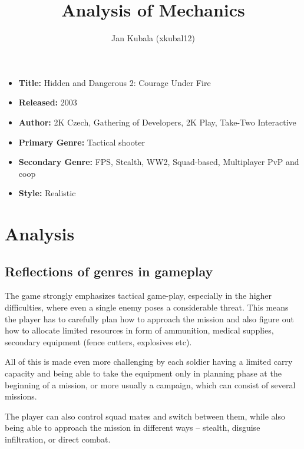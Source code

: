 \documentclass[a4paper,10pt,english]{article}
\title{%
Analysis of Mechanics%
}
\author{%
Jan Kubala (xkubal12)%
}
\date{}
\begin{document}
\maketitle
\thispagestyle{empty}

{%
\large

\begin{itemize}

\item[] \textbf{Title:} Hidden and Dangerous 2: Courage Under Fire

\item[] \textbf{Released:} 2003

\item[] \textbf{Author:} 2K Czech, Gathering of Developers, 2K Play, Take-Two Interactive

\item[] \textbf{Primary Genre:} Tactical shooter

\item[] \textbf{Secondary Genre:} FPS, Stealth, WW2, Squad-based, Multiplayer PvP and coop

\item[] \textbf{Style:} Realistic

\end{itemize}

}

\section*{\centering Analysis}
\subsection*{Reflections of genres in gameplay}
The game strongly emphasizes tactical game-play, especially in the higher difficulties, where even a single enemy poses a considerable threat. This means the player has to carefully plan how to approach the mission and also figure out how to allocate limited resources in form of ammunition, medical supplies, secondary equipment (fence cutters, explosives etc).

All of this is made even more challenging by each soldier having a limited carry capacity and being able to take the equipment only in planning phase at the beginning of a mission, or more usually a campaign, which can consist of several missions.

The player can also control squad mates and switch between them, while also being able to approach the mission in different ways -- stealth, disguise infiltration, or direct combat.
\end{document}
